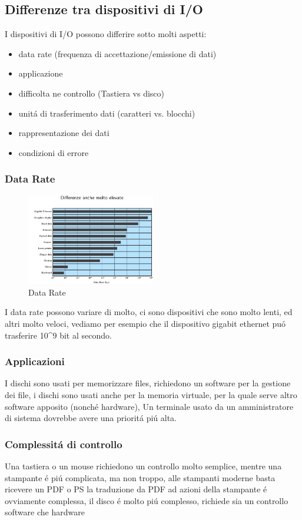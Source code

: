 \subsection{Differenze tra dispositivi di I/O}
I dispositivi di I/O possono differire sotto molti aspetti:
\begin{itemize}
    \item data rate (frequenza di accettazione/emissione di dati)
    \item applicazione
    \item difficolta ne controllo (Tastiera vs disco)
    \item unitá di trasferimento dati (caratteri vs. blocchi)
    \item rappresentazione dei dati
    \item condizioni di errore
\end{itemize}
\subsubsection*{Data Rate}
\begin{figure}[H]
    \centering
    \includegraphics[width=0.5\textwidth]{immagini/DataRate}
    \caption{Data Rate}
\end{figure}
I data rate possono variare di molto, ci sono dispositivi che sono molto lenti, ed altri molto veloci, vediamo per esempio
che il dispositivo gigabit ethernet puó trasferire 10^9 bit al secondo.
\subsubsection*{Applicazioni}
I dischi sono usati per memorizzare files, richiedono un software per la gestione dei file, i dischi sono usati anche per la memoria
virtuale, per la quale serve altro software apposito (nonché hardware), Un terminale usato da un amministratore di sistema dovrebbe
avere una prioritá piú alta.
\subsubsection*{Complessitá di controllo}
Una tastiera o un mouse richiedono un controllo molto semplice, mentre una stampante é piú complicata, ma non troppo, alle stampanti moderne basta ricevere un PDF o PS
la traduzione da PDF ad azioni della stampante é ovviamente complessa, il disco é molto piú complesso, richiede sia un controllo software che hardware
